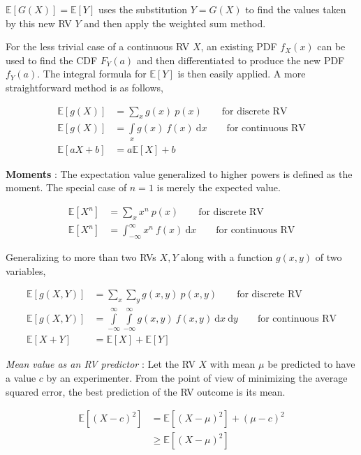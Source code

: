 $ \mathbb{E}[G(X)] = \mathbb{E}[Y] $ uses the substitution $ Y = G(X) $ to find the values taken by this new RV $ Y $ and then apply the weighted sum method.

For the less trivial case of a continuous RV $ X $, an existing PDF $ f_X (x) $ can be used to find the CDF $ F_Y(a) $ and then differentiated to produce the new PDF $ f_Y(a) $. The integral formula for $ \mathbb{E}[Y] $ is then easily applied. A more straightforward method is as follows, 

\begin{align}
	\mathbb{E}[g(X)] &= \sum\limits_{x} g(x)\ p(x)  \qquad \text{for discrete RV} \\
	\mathbb{E}[g(X)] &= \int\limits_{x} g(x)\ f(x)\ \mathrm{d}x  \qquad \text{for continuous RV} \\
	\mathbb{E}[aX + b] &= a \mathbb{E}[X] + b \nonumber
\end{align}

\textbf{Moments} : The expectation value generalized to higher powers is defined as the moment. The special case of $ n = 1 $ is merely the expected value.

\begin{align}
	\mathbb{E}[X^n] &= \sum_{x} x^n\ p(x) \qquad \text{for discrete RV} \\
	\mathbb{E}[X^n] &= \int_{-\infty}^{\infty} x^n\ f(x)\ \mathrm{d}x \qquad \text{for continuous RV}
\end{align}

Generalizing to more than two RVs $ X, Y $ along with a function $ g(x,y) $ of two variables,

\begin{align}
	\mathbb{E}[g(X, Y)] &= \sum\limits_{x} \sum\limits_{y} g(x, y)\ p(x, y)  \qquad \text{for discrete RV} \\
	\mathbb{E}[g(X, Y)] &= \int\limits_{-\infty}^{\infty} \int\limits_{-\infty}^{\infty} g(x, y)\ f(x, y)\ \mathrm{d}x \ \mathrm{d}y  \qquad \text{for continuous RV} \\
	\mathbb{E}[X + Y] &= \mathbb{E}[X] + \mathbb{E}[Y] \nonumber
\end{align}

\textit{Mean value as an RV predictor} : Let the RV $ X $ with mean $ \mu $ be predicted to have a value $ c $ by an experimenter. From the point of view of minimizing the average squared error, the best prediction of the RV outcome is its mean.

\begin{align}
	\mathbb{E}[(X - c)^2] &= \mathbb{E}[(X - \mu)^2] + (\mu - c)^2 \nonumber \\
	&\geq \mathbb{E}[(X - \mu)^2] 
\end{align}

